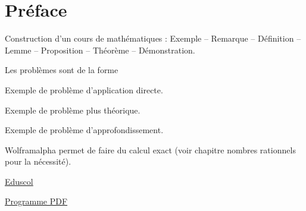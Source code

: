 
\chapter*{Préface}

Construction d'un cours de mathématiques : Exemple -- Remarque -- Définition -- Lemme -- Proposition -- Théorème -- Démonstration.

Les problèmes sont de la forme
\begin{Exercise}[counter=preface]
	Exemple de problème d'application directe.
\end{Exercise}
\begin{Exercise}[difficulty=1, counter=preface]
	Exemple de problème plus théorique.
\end{Exercise}
\begin{Exercise}[difficulty=2, counter=preface]
	Exemple de problème d'approfondissement.
\end{Exercise}


Wolframalpha permet de faire du calcul exact (voir chapitre nombres rationnels pour la nécessité).



\href{https://eduscol.education.fr/1723/programmes-et-ressources-en-mathematiques-voie-gt}{Eduscol}

\href{https://eduscol.education.fr/document/24553/download}{Programme PDF}